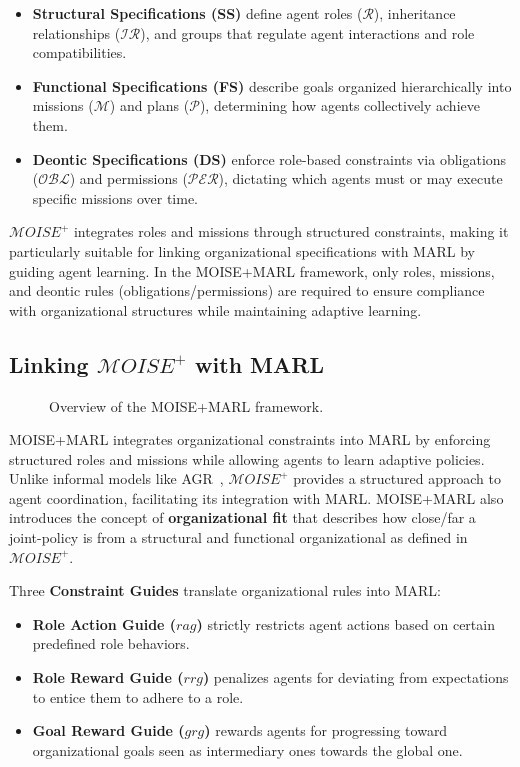 \documentclass[pdflatex,sn-mathphys-num]{sn-jnl}%
\theoremstyle{thmstyleone}%
\theoremstyle{thmstyletwo}%
\theoremstyle{thmstylethree}%
\begin{document}
\begin{itemize}
    \item \textbf{Structural Specifications (SS)} define agent roles ($\mathcal{R}$), inheritance relationships ($\mathcal{IR}$), and groups that regulate agent interactions and role compatibilities.
    \item \textbf{Functional Specifications (FS)} describe goals organized hierarchically into missions ($\mathcal{M}$) and plans ($\mathcal{P}$), determining how agents collectively achieve them.
    \item \textbf{Deontic Specifications (DS)} enforce role-based constraints via obligations ($\mathcal{OBL}$) and permissions ($\mathcal{PER}$), dictating which agents must or may execute specific missions over time.
\end{itemize}

$\mathcal{M}OISE^+$ integrates roles and missions through structured constraints, making it particularly suitable for linking organizational specifications with MARL by guiding agent learning. In the MOISE+MARL framework, only roles, missions, and deontic rules (obligations/permissions) are required to ensure compliance with organizational structures while maintaining adaptive learning.

\subsection{Linking $\mathcal{M}OISE^+$ with MARL}

\begin{figure}[h!]
    \centering
    
    \caption{Overview of the MOISE+MARL framework.}
    \label{fig:mm_synthesis}
\end{figure}

MOISE+MARL integrates organizational constraints into MARL by enforcing structured roles and missions while allowing agents to learn adaptive policies. Unlike informal models like AGR~\cite{ferber2003}, $\mathcal{M}OISE^+$ provides a structured approach to agent coordination, facilitating its integration with MARL. MOISE+MARL also introduces the concept of \textbf{organizational fit} that describes how close/far a joint-policy is from a structural and functional organizational as defined in $\mathcal{M}OISE^+$.

Three \textbf{Constraint Guides} translate organizational rules into MARL:
\begin{itemize}
    \item \textbf{Role Action Guide ($rag$)} strictly restricts agent actions based on certain predefined role behaviors.
    \item \textbf{Role Reward Guide ($rrg$)} penalizes agents for deviating from expectations to entice them to adhere to a role.
    \item \textbf{Goal Reward Guide ($grg$)} rewards agents for progressing toward organizational goals seen as intermediary ones towards the global one.
\end{itemize}
\end{document}
